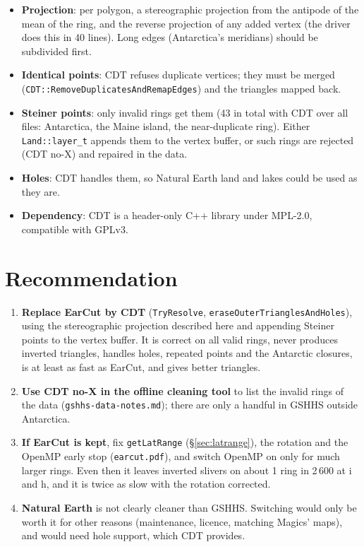 \documentclass[11pt,a4paper]{article}
\newcommand{\code}[1]{\texttt{#1}}
\begin{document}
\begin{itemize}
\item \textbf{Projection}: per polygon, a stereographic projection from the antipode of the mean of
  the ring, and the reverse projection of any added vertex (the driver does this in 40 lines).
  Long edges (Antarctica's meridians) should be subdivided first.
\item \textbf{Identical points}: CDT refuses duplicate vertices; they must be merged
  (\code{CDT::RemoveDuplicatesAndRemapEdges}) and the triangles mapped back.
\item \textbf{Steiner points}: only invalid rings get them (43 in total with CDT over all files:
  Antarctica, the Maine island, the near-duplicate ring). Either \code{Land::layer\_t} appends them to the
  vertex buffer, or such rings are rejected (CDT no-X) and repaired in the data.
\item \textbf{Holes}: CDT handles them, so Natural Earth land and lakes could be used as they are.
\item \textbf{Dependency}: CDT is a header-only C++ library under MPL-2.0, compatible with GPLv3.
\end{itemize}

\section{Recommendation}

\begin{enumerate}
\item \textbf{Replace EarCut by CDT} (\code{TryResolve}, \code{eraseOuterTrianglesAndHoles}),
  using the stereographic projection described here and appending Steiner points to the vertex
  buffer. It is correct on all valid rings, never produces inverted triangles, handles holes,
  repeated points and the Antarctic closures, is at least as fast as EarCut, and gives better
  triangles.
\item \textbf{Use CDT no-X in the offline cleaning tool} to list the invalid rings of the data
  (\code{gshhs-data-notes.md}); there are only a handful in GSHHS outside Antarctica.
\item \textbf{If EarCut is kept}, fix \code{getLatRange} (\S\ref{sec:latrange}), the rotation and
  the OpenMP early stop (\code{earcut.pdf}), and switch OpenMP on only for much larger rings.
  Even then it leaves inverted slivers on about 1 ring in 2\,600 at i and h, and it is twice as
  slow with the rotation corrected.
\item \textbf{Natural Earth} is not clearly cleaner than GSHHS. Switching would only be worth it
  for other reasons (maintenance, licence, matching Magics' maps), and would need hole support,
  which CDT provides.
\end{enumerate}
\end{document}
